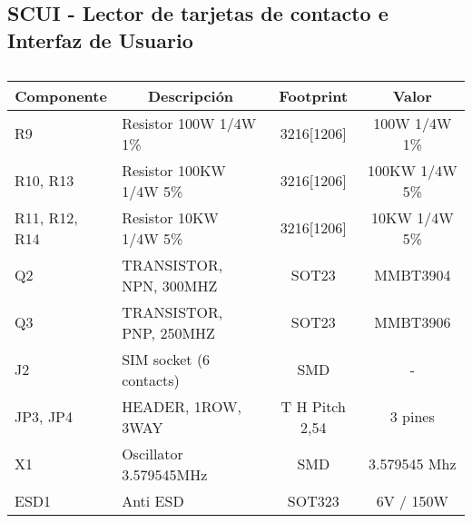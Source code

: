 \subsection{SCUI - Lector de tarjetas de contacto e Interfaz de Usuario}
\begin{table}[htbp]
\begin{center}
\begin{tabular}{|l|l|c|c|}
\hline
\multicolumn{1}{|c|}{\textbf{Componente}} & \multicolumn{1}{c|}{\textbf{Descripción}} & \textbf{ Footprint} & \textbf{Valor} \\ \hline
R9 & Resistor 100W 1/4W 1\%  & 3216[1206] & 100W 1/4W  1\% \\ \hline
R10, R13 & Resistor 100KW 1/4W 5\%  & 3216[1206] & 100KW 1/4W   5\% \\ \hline
R11, R12, R14 & Resistor 10KW 1/4W 5\%  & 3216[1206] & 10KW 1/4W   5\% \\ \hline
Q2 & TRANSISTOR, NPN, 300MHZ & SOT23 & MMBT3904 \\ \hline
Q3 & TRANSISTOR, PNP, 250MHZ & SOT23 & MMBT3906 \\ \hline
J2 & SIM socket (6 contacts) & SMD & - \\ \hline
JP3, JP4 & HEADER, 1ROW, 3WAY & T H Pitch 2,54 & 3 pines \\ \hline
X1 & Oscillator 3.579545MHz & SMD & 3.579545 Mhz \\ \hline
ESD1 & Anti ESD & SOT323 & 6V / 150W \\ \hline
\end{tabular}
\end{center}
\caption{}
\label{}
\end{table}

